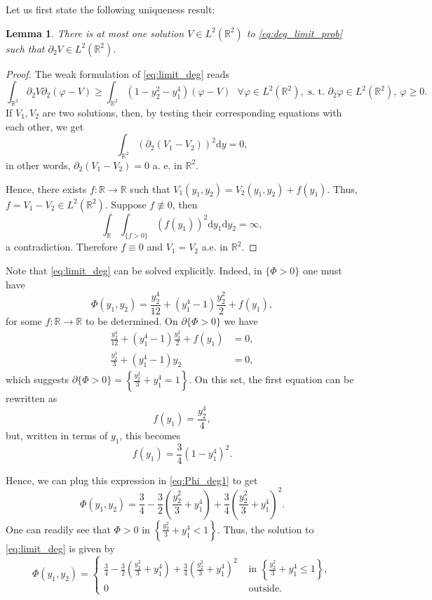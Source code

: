 \documentclass[10pt,a4paper]{article}
\newcommand{\RR}{\mathbb{R}}
\newcommand{\faskip}{\hspace{8pt}}
\newtheorem{lem}[thm]{Lemma}
\numberwithin{equation}{section}
\begin{document}
Let us first state the following uniqueness result:
\begin{lem}
	\label{lem:deg_uniqueness}
	There is at most one solution $ V \in L^{2}(\RR^{2}) $ to \eqref{eq:deg_limit_prob} such that $ \partial_2 V\in L^{2}(\RR^{2}) $.
\end{lem}
\begin{proof}
	The weak formulation of \eqref{eq:limit_deg} reads
	\begin{equation}
		\label{eq:deg_limit_weak}
		\int_{\RR^{2}} \partial_2 V \partial_2(\varphi - V) \geq \int_{\RR^{2}} \left( 1 - y_2^{2} - y_1^{4} \right) (\varphi - V) \faskip \forall \varphi \in L^2(\RR^{2}), \text{ s. t. } \partial_2 \varphi \in L^2(\RR^2),~ \varphi \geq 0.
	\end{equation}
	If $ V_1, V_2 $	are two solutions, then, by testing their corresponding equations with each other, we get 
	\[\int_{\RR^{2}} (\partial_2(V_1 - V_2))^{2} \mathrm{d}y = 0, \]
in other words, $ \partial_2 (V_1 - V_2) = 0 $ a. e. in $ \RR^2 $.

Hence, there exists $ f:\RR \rightarrow \RR $ such that $V_1(y_1, y_2) = V_2(y_1,y_2) + f(y_1) $. Thus, $f = V_1 - V_2 \in L^{2}(\RR^{2})$. Suppose $f\not \equiv 0$, then
\[\int_{\RR} \int_{\{f > 0\}} (f(y_1))^2 \mathrm{d}y_1 \mathrm{d}y_2 = \infty,\]
a contradiction. Therefore $ f\equiv 0 $ and $ V_1 = V_2 $ a.e. in $\RR^2$.
\end{proof}

Note that \eqref{eq:limit_deg} can be solved explicitly. Indeed, in $\{\Phi > 0\}$ one must have 
\begin{equation}
	\label{eq:Phi_deg1}
	\Phi(y_1, y_2) = \frac{y_2^{4}}{12} +(y_1^{4} -1) \frac{y_2^{2}}{2} + f(y_1),
\end{equation}
for some $f: \RR \rightarrow \RR$ to be determined. On $\partial \{ \Phi>0\}$ we have
\begin{align*}
	\frac{y_2^{4}}{12} + ( y_1^{4} -1) \frac{y_2^{2}}{2} + f(y_1) &= 0, \\
	\frac{y_2^{3}}{3} + ( y_1^{4} -1) y_2 &= 0,
\end{align*}
which suggests $\partial \{ \Phi>0\} = \left\{\frac{ y_2^{2}}{3} + y_1^{4} = 1 \right\}$. On this set, the first equation can be rewritten as
\[
	f(y_1) = \frac{ y_2^{4}}{4},
\]
but, written in terms of $y_1$, this becomes
\[
	f(y_1) = \frac{3}{4}(1 -  y_1^{4})^{2}.
\]

Hence, we can plug this expression in \eqref{eq:Phi_deg1} to get
\[
	\Phi(y_1,y_2) = \frac{3}{4} - \frac{3}{2} \left( \frac{y_2^{2}}{3} +  y_1^{4} \right) + \frac{3}{4} \left( \frac{y_2^{2}}{3} + y_1^{4} \right)^{2}.
\]
One can readily see that $\Phi > 0$ in $\left\{\frac{ y_2^{2}}{3} +  y_1^{4} < 1\right\}$. Thus, the solution to \eqref{eq:limit_deg} is given by 
\begin{equation}
	\label{eq:deg_sol}
	\Phi(y_1, y_2) = \begin{cases}
	\frac{3}{4} - \frac{3}{2} \left( \frac{ y_2^{2}}{3} + y_1^{4} \right) + \frac{3}{4} \left( \frac{y_2^{2}}{3} + y_1^{4} \right)^{2} & \text{ in } \left\{\frac{y_2^{2}}{3} + y_1^{4} \leq 1\right\}, \\
	0 & \text{ outside}.
\end{cases}
\end{equation}
\end{document}
